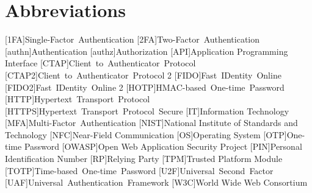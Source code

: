 \documentclass[twoside,twocolumn]{article}
\title{\mytitle} %
\author{%
  \textsc{\myauthor} \\[1ex] %
  \normalsize 3087271 \\ %
  \normalsize \href{mailto:nils.siegle@stud.uni-due.de}{nils.siegle@stud.uni-due.de} \\[2ex]
  \normalsize \emph{Supervisor:} \mysup \\
  [5ex]
  \mydate
}
\date{} %
\begin{document}
\maketitle

\newpage
\onecolumn
\tableofcontents
\newpage


\section*{Abbreviations}
\begin{acronym}[AAAAAAA]
  [1FA]{Single-Factor Authentication}
  [2FA]{Two-Factor Authentication}
  [authn]{Authentication}
  [authz]{Authorization}
  [API]{Application Programming Interface}
  [CTAP]{Client to Authenticator Protocol}
  [CTAP2]{Client to Authenticator Protocol 2}
  [FIDO]{Fast IDentity Online}
  [FIDO2]{Fast IDentity Online 2}
  [HOTP]{HMAC-based One-time Password}
  [HTTP]{Hypertext Transport Protocol}
  [HTTPS]{Hypertext Transport Protocol Secure}
  [IT]{Information Technology}
  [MFA]{Multi-Factor Authentication}
  [NIST]{National Institute of Standards and Technology}
  [NFC]{Near-Field Communication}
  [OS]{Operating System}
  [OTP]{One-time Password}
  [OWASP]{Open Web Application Security Project}
  [PIN]{Personal Identification Number}
  [RP]{Relying Party}
  [TPM]{Trusted Platform Module}
  [TOTP]{Time-based One-time Password}
  [U2F]{Universal Second Factor}
  [UAF]{Universal Authentication Framework}
  [W3C]{World Wide Web Consortium}
\end{acronym}


\newpage
\twocolumn

\end{document}
